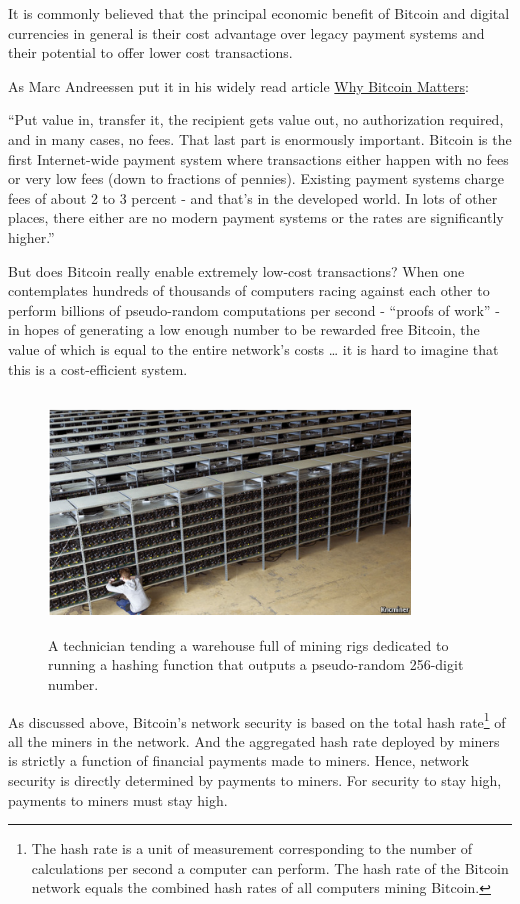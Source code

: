 \documentclass[a4paper,11pt]{article}
\begin{document}
It is commonly believed that the principal economic benefit of Bitcoin and digital currencies in general is their cost advantage over legacy payment systems and their potential to offer lower cost transactions.

As Marc Andreessen put it in his widely read article \href{http://dealbook.nytimes.com/2014/01/21/why-Bitcoin-matters/}{Why Bitcoin Matters}: 

``Put value in, transfer it, the recipient gets value out, no authorization required, and in many cases, no fees. That last part is enormously important. Bitcoin is the first Internet-wide payment system where transactions either happen with no fees or very low fees (down to fractions of pennies). Existing payment systems charge fees of about 2 to 3 percent - and that's in the developed world. In lots of other places, there either are no modern payment systems or the rates are significantly higher.''

But does Bitcoin really enable extremely low-cost transactions? When one contemplates hundreds of thousands of computers racing against each other to perform billions of pseudo-random computations per second - ``proofs of work'' - in hopes of generating a low enough number to be rewarded free Bitcoin, the value of which is equal to the entire network's costs … it is hard to imagine that this is a cost-efficient system.


\begin{figure}[H]
\centering
\includegraphics[width=96mm,height=63mm]{01_miners.png}
\caption{A technician tending a warehouse full of mining rigs dedicated to 
running a hashing function that outputs a pseudo-random 256-digit number.}
\end{figure}

As discussed above, Bitcoin's network security is based on the total hash rate\footnote{The hash rate is a unit of measurement corresponding to the number of calculations per second a computer can perform. The hash rate of the Bitcoin network equals the combined hash rates of all computers mining Bitcoin.} of all the miners in the network. And the aggregated hash rate deployed by miners is strictly a function of financial payments made to miners. Hence, network security is directly determined by payments to miners. For security to stay high, payments to miners must stay high.
\end{document}
